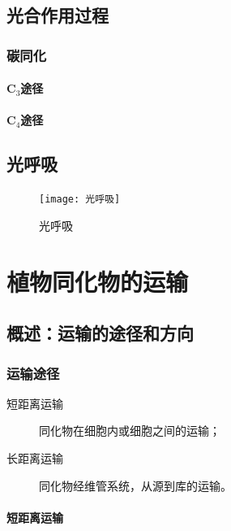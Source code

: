 \subsection{光合作用过程}





\subsubsection{碳同化}

\paragraph{C$_{3}$途径}

\paragraph{C$_{4}$途径}

\subsection{光呼吸}

\begin{figure}[htbp]
	\centering
	\texttt{[image: 光呼吸]}
	\caption{光呼吸}
	\label{fig:光呼吸}
\end{figure}



\section{植物同化物的运输}

\subsection{概述：运输的途径和方向}

\subsubsection{运输途径}

\begin{description}
	\item[短距离运输] 同化物在细胞内或细胞之间的运输；
	\item[长距离运输] 同化物经维管系统，从源到库的运输。
\end{description}

\paragraph{短距离运输}